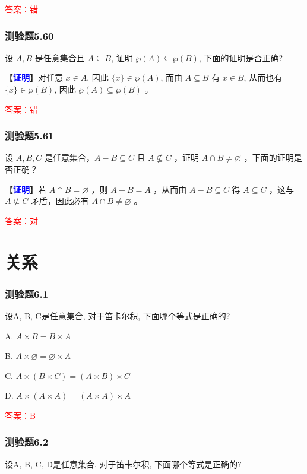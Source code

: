 \documentclass[UTF8, heading=true]{ctexart}
\begin{document}
\textcolor{red}{答案：错}
\subsubsection{测验题5.60}
设 $A, B$ 是任意集合且 $A \subseteq B$, 证明 $\wp(A) \subseteq \wp(B)$, 下面的证明是否正确?

【\textcolor{blue}{\textbf{证明}}】对任意 $x \in A$, 因此 $\{x\} \in \wp(A)$, 而由 $A \subseteq B$ 有 $x \in B$, 从而也有 $\{x\} \in \wp(B)$, 因此 $\wp(A) \subseteq \wp(B)$ 。

\textcolor{red}{答案：错}

\subsubsection{测验题5.61}

设 $A, B, C$ 是任意集合，$A-B \subseteq C$ 且 $A \nsubseteq C$ ，证明 $A \cap B \neq \varnothing$ ，下面的证明是否正确？

【\textcolor{blue}{\textbf{证明}}】若 $A \cap B=\varnothing$ ，则 $A-B=A$ ，从而由 $A-B \subseteq C$ 得 $A \subseteq C$ ，这与 $A \nsubseteq C$ 矛盾，因此必有 $A \cap B \neq \varnothing$ 。


\textcolor{red}{答案：对}

\clearpage

\section{关系}

\subsubsection{测验题6.1}

设A, B, C是任意集合, 对于笛卡尔积, 下面哪个等式是正确的?

A. 
$
A \times B=B \times A
$

B. 
$
A \times \varnothing=\varnothing \times A
$

C. 
$
A \times(B \times C)=(A \times B) \times C
$

D. 
$
A \times(A \times A)=(A \times A) \times A
$

\textcolor{red}{答案：B}


\subsubsection{测验题6.2}
设A, B, C, D是任意集合, 对于笛卡尔积, 下面哪个等式是正确的?
\end{document}
